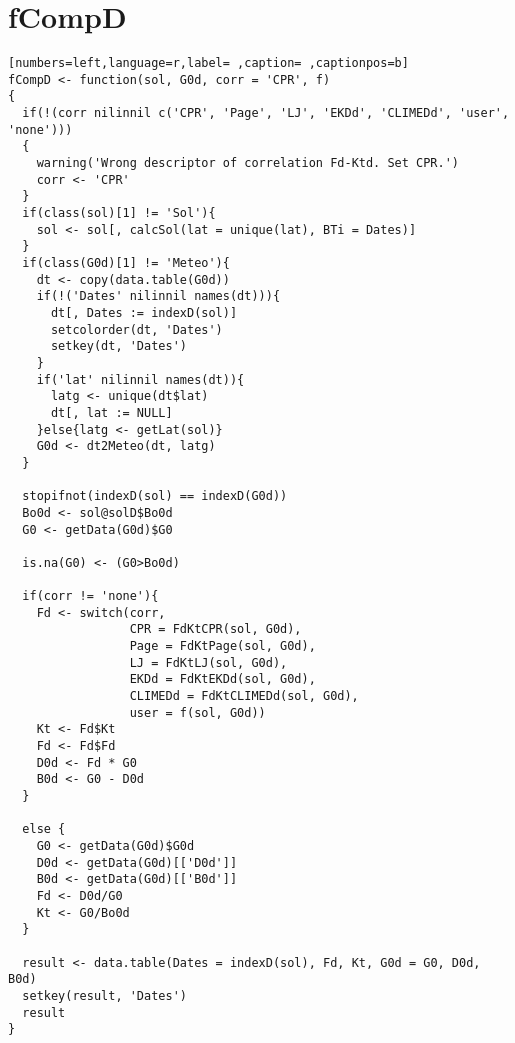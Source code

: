 \section{fCompD}
\label{sec:org8f55aee}
\begin{lstlisting}[numbers=left,language=r,label= ,caption= ,captionpos=b]
fCompD <- function(sol, G0d, corr = 'CPR', f)
{
  if(!(corr nilinnil c('CPR', 'Page', 'LJ', 'EKDd', 'CLIMEDd', 'user', 'none')))
  {
    warning('Wrong descriptor of correlation Fd-Ktd. Set CPR.')
    corr <- 'CPR'
  }
  if(class(sol)[1] != 'Sol'){
    sol <- sol[, calcSol(lat = unique(lat), BTi = Dates)]
  }
  if(class(G0d)[1] != 'Meteo'){
    dt <- copy(data.table(G0d))
    if(!('Dates' nilinnil names(dt))){
      dt[, Dates := indexD(sol)]
      setcolorder(dt, 'Dates')
      setkey(dt, 'Dates')
    }
    if('lat' nilinnil names(dt)){
      latg <- unique(dt$lat)
      dt[, lat := NULL]
    }else{latg <- getLat(sol)}
    G0d <- dt2Meteo(dt, latg)
  }  

  stopifnot(indexD(sol) == indexD(G0d))
  Bo0d <- sol@solD$Bo0d
  G0 <- getData(G0d)$G0

  is.na(G0) <- (G0>Bo0d)

  if(corr != 'none'){
    Fd <- switch(corr,
                 CPR = FdKtCPR(sol, G0d),
                 Page = FdKtPage(sol, G0d),
                 LJ = FdKtLJ(sol, G0d),
                 EKDd = FdKtEKDd(sol, G0d),
                 CLIMEDd = FdKtCLIMEDd(sol, G0d),
                 user = f(sol, G0d))
    Kt <- Fd$Kt
    Fd <- Fd$Fd
    D0d <- Fd * G0
    B0d <- G0 - D0d
  }

  else {
    G0 <- getData(G0d)$G0d
    D0d <- getData(G0d)[['D0d']]
    B0d <- getData(G0d)[['B0d']]
    Fd <- D0d/G0
    Kt <- G0/Bo0d
  }

  result <- data.table(Dates = indexD(sol), Fd, Kt, G0d = G0, D0d, B0d)
  setkey(result, 'Dates')
  result
}
\end{lstlisting}
